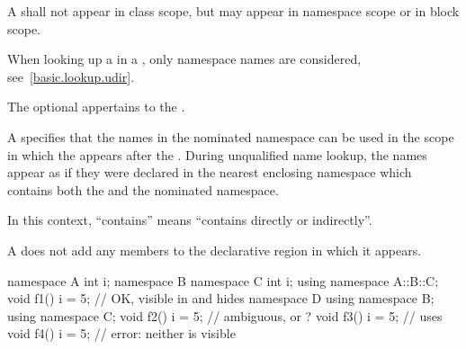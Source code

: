 \pnum
A  shall not appear in class scope, but may
appear in namespace scope or in block scope.
\begin{note}
When looking up a  in a
, only namespace names are considered,
see~\ref{basic.lookup.udir}.
\end{note}
The optional  appertains to the .

\pnum
A  specifies that the names in the nominated
namespace can be used in the scope in which the
 appears after the .
During unqualified name lookup, the names
appear as if they were declared in the nearest enclosing namespace which
contains both the  and the nominated
namespace.
\begin{note}
In this context, ``contains'' means ``contains directly or indirectly''.
\end{note}

\pnum
A  does not add any members to the declarative
region in which it appears.
\begin{example}
\begin{codeblock}
namespace A {
  int i;
  namespace B {
    namespace C {
      int i;
    }
    using namespace A::B::C;
    void f1() {
      i = 5;        // OK,  visible in  and hides 
    }
  }
  namespace D {
    using namespace B;
    using namespace C;
    void f2() {
      i = 5;        // ambiguous,  or ?
    }
  }
  void f3() {
    i = 5;          // uses 
  }
}
void f4() {
  i = 5;            // error: neither  is visible
}
\end{codeblock}
\end{example}


